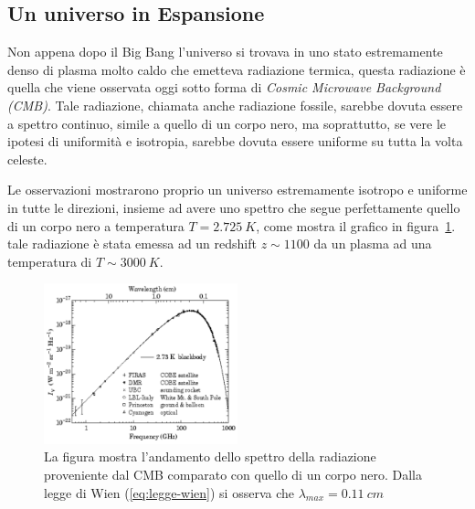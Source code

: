 \subsection{Un universo in Espansione}\label{sec:unverso-espansione}
Non appena dopo il Big Bang l'universo si trovava in uno stato estremamente denso di plasma molto caldo che emetteva radiazione termica, questa radiazione è quella che viene osservata oggi sotto forma di \textit{Cosmic Microwave Background (CMB)}. Tale radiazione, chiamata anche radiazione fossile, sarebbe dovuta essere a spettro continuo, simile a quello di un corpo nero, ma soprattutto, se vere le ipotesi di uniformità e isotropia, sarebbe dovuta essere uniforme su tutta la volta celeste. 

Le osservazioni mostrarono proprio un universo estremamente isotropo e uniforme in tutte le direzioni, insieme ad avere uno spettro che segue perfettamente quello di un corpo nero a temperatura $T = \SI{2.725}{K}$, come mostra il grafico in figura~\ref{fig:balckbody-universe}. tale radiazione è stata emessa ad un redshift $z \sim 1100$ da un plasma ad una temperatura di $T \sim \SI{3000}{K}$.
\begin{figure}
    \centering
    \includegraphics[width = 0.5\textwidth]{immagini/blackbody-universe.png}
    \caption{La figura mostra l'andamento dello spettro della radiazione proveniente dal CMB comparato con quello di un corpo nero. Dalla legge di Wien (\ref{eq:legge-wien}) si osserva che $\lambda_{max}= \SI{0.11}{cm}$}\label{fig:balckbody-universe}
\end{figure}

